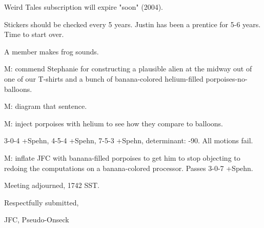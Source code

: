 \documentclass[12pt]{article}
\begin{document}
Weird Tales subscription will expire "soon" (2004).

Stickers should be checked every 5 years. Justin has been a prentice for 5-6 years. Time to start over.

A member makes frog sounds.

M: commend Stephanie for constructing a plausible alien at the midway out of one of our T-shirts and a bunch of banana-colored helium-filled porpoises-no-balloons.

M: diagram that sentence.

M: inject porpoises with helium to see how they compare to balloons.

3-0-4 +Spehn, 4-5-4 +Spehn, 7-5-3 +Spehn, determinant: -90. All motions fail.

M: inflate JFC with banana-filled porpoises to get him to stop objecting to redoing the computations on a banana-colored processor. Passes 3-0-7 +Spehn.

\vspace{12pt}

\noindent
Meeting adjourned, 1742 SST.

\vspace{18pt}

\centerline{Respectfully submitted,}
\centerline{JFC, Pseudo-Onseck}
\end{document}
